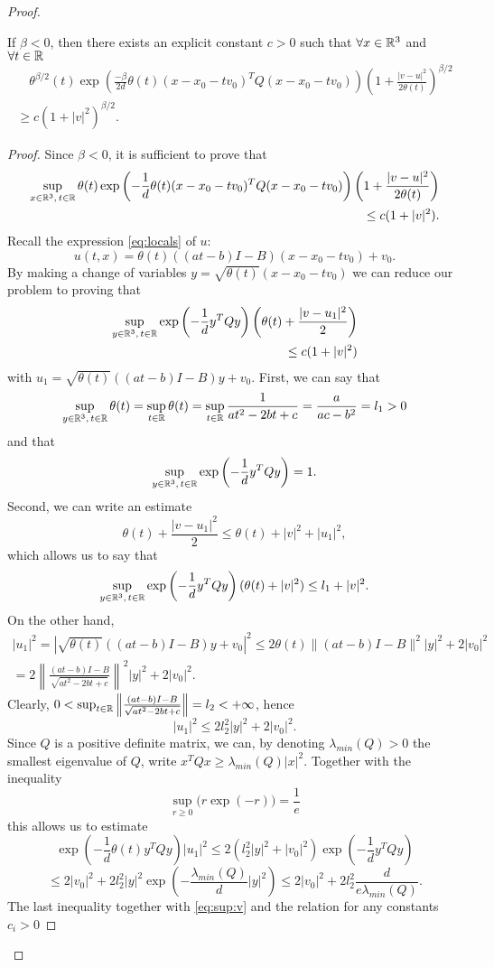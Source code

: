\begin{proof}
\begin{proposition}\label{pr:lower}
	If $\beta<0$, then there exists an explicit constant $c>0$ such that $\forall x\in{\mathbb R^3}$ and $\forall t\in {\mathbb R}$
	\[\begin{split}
		\quad\theta^{\beta/2}(t)\exp\left(\frac{-\beta}{2d} \theta(t) (x-x_0-tv_0)^TQ(x-x_0-tv_0)\right)\left(1+\frac{|v-u|^2}{2 \theta(t)}\right)^{\beta/2}\\\ge c\left(  1+ |v|^2 \right)^{\beta/2}.
	\end{split}\]
\end{proposition}
\begin{proof}
	Since $\beta<0$, it is sufficient to prove that
	\[\begin{split}
		\sup_{x\in{\mathbb R^3},\, t\in {\mathbb R}}\theta(t)\exp\left(-\frac{1}{d} \theta(t) (x-x_0-tv_0)^TQ(x-x_0-tv_0)\right)\left(1+\frac{|v-u|^2}{2 \theta(t)}\right)\\\le c (1  +|v|^2)   .
	\end{split}\]
	Recall the expression \eqref{eq:locals} of $u$:
	\[u(t,x) = \theta(t)\left((at-b)I-B\right)(x-x_0-tv_0)+v_0.\]
	By making a change of variables $y= \sqrt{\theta(t)}(x-x_0-tv_0)$ we can reduce our problem to proving that 
	\[\begin{split}
		\sup_{y\in{\mathbb R^3},\, t\in {\mathbb R}}\exp\left(-\frac{1}{d}  y^TQy\right)\left(\theta(t)+\frac{|v-u_1|^2}{2 }\right)\\\le c (1  +|v|^2)
	\end{split}\]
	with $u_1 = \sqrt{\theta(t)}\left((at-b)I-B\right)y+v_0$.
First, we can say that
\[
	\sup_{y\in{\mathbb R^3},\,t\in {\mathbb R}}\theta(t)=\sup_{t\in{\mathbb R}}\theta(t)=\sup_{t\in{\mathbb R}}\frac{1}{at^2-2bt+c}=\frac{a}{ac-b^2}=l_1>0
\]
and that
\[
	\sup_{y\in{\mathbb R^3},\,t\in {\mathbb R}}\exp\left(-\frac{1}{d} y^TQy\right)=1.
\]
	Second, we can write an estimate \[
	\theta(t)+\frac{|v-u_1|^2}{2}\le \theta(t)+|v|^2+|u_1|^2,
\]
which allows us to say that
\begin{equation}
	\sup_{y\in\mbrt,\,t\in \mbo} \exp\left(-\frac{1}{d}  y^TQy\right)(\theta(t)+|v|^2)\le l_1+ |v|^2.
%
	\label{eq:sup:v}
\end{equation}
On the other hand, 
\[
	\begin{split}
		|u_1|^2 = \left| \sqrt{\theta(t)}((at-b)I-B)y+v_0\right|^2\le 2 \theta(t)\|(at-b)I-B\|^2|y|^2+2|v_0|^2\\=2\left\|\frac{(at-b)I-B}{\sqrt{at^2-2bt+c}}\right\|^2|y|^2+2|v_0|^2.
	\end{split}
\]
Clearly, $0<\sup_{t \in{\mathbb R}}\left\|\frac{(at-b)I-B}{\sqrt{at^2-2bt+c}}\right\|=l_2<+\infty $, hence
\[
	|u_1|^2\le 2l_2^2 |y|^2  +2|v_0|^2.
\]
Since $Q$ is a positive definite matrix, we can, by denoting $\lambda_{min}(Q)>0$ the smallest eigenvalue of $Q$, write $x^TQx\ge \lambda_{min}(Q)|x|^2$. Together with the inequality \[\sup_{r\ge0}\big(r\exp(-r)\big)=\frac{1}{e}\] this allows us to estimate
\[
\exp\left(-\frac{1}{d} \theta(t) y^TQy\right)|u_1|^2\le 2(l_2^2 |y|^2+|v_0|^2) \exp\left(-\frac{1}{d} y^TQy\right)
\]
\[
	\le 2|v_0|^2 +2l_2^2|y|^2 \exp\left(-\frac{\lambda_{min}(Q)}{d} |y|^2\right)\le 2|v_0|^2 +2l_2^2\frac{d}{e\lambda_{min}(Q)}.
\]
The last inequality together with \eqref{eq:sup:v} and the relation for any constants $c_i>0$


\end{proof}
\end{proof}
